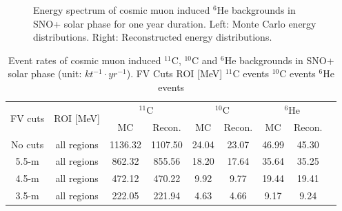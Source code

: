 \begin{figure}[htbp]
	\caption{Energy spectrum of cosmic muon induced $^{6}$He backgrounds in SNO+ solar phase for one year duration. Left: Monte Carlo energy distributions. Right: Reconstructed energy distributions.}
	\label{muonSolarHe6}
\end{figure}


\begin{table}[ht]
	\caption{Event rates of cosmic muon induced $^{11}$C, $^{10}$C and $^6$He backgrounds in SNO+ solar phase (unit: $kt^{-1}\cdot yr^{-1}$). FV Cuts ROI [MeV] $^{11}$C events $^{10}$C events $^{6}$He events}
	\centering
	\begin{tabular*}{150mm}{c@{\extracolsep{\fill}}cccccccc}
		\toprule
		\multirow{2}{*}{FV cuts} & \multirow{2}{*}{ROI [MeV]} & \multicolumn{2}{c}{$^{11}$C} & \multicolumn{2}{c}{$^{10}$C} & \multicolumn{2}{c}{$^{6}$He}\\
		\cline{3-4}  \cline{5-6} \cline{7-8}
		&  & MC & Recon.& MC& Recon.& MC& Recon.\\
		\midrule
		No cuts & all regions &  1136.32 & 1107.50 & 24.04& 23.07& 46.99& 45.30\\
		5.5-m & all regions & 862.32& 855.56& 18.20& 17.64& 35.64& 35.25\\
		4.5-m & all regions & 472.12&470.22& 9.92& 9.77& 19.44& 19.41\\
		3.5-m & all regions & 222.05& 221.94& 4.63& 4.66& 9.17& 9.24\\
		\bottomrule		
	\end{tabular*}\label{muon_eventrates2}
\end{table}

